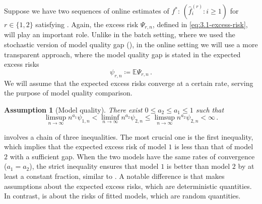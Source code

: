 \documentclass[11pt]{article}
\theoremstyle{plain}
\newtheorem{assumption}[theorem]{Assumption}
\begin{document}
Suppose we have two sequences of online estimates of $f^*$: $(\hat f_i^{(r)}:i\ge 1)$ for $r\in\{1,2\}$ satisfying .
  Again, the excess risk $\Psi_{r,n}$, defined in \eqref{eq:3.1-excess-risk}, will play an important role.   
Unlike in the batch setting, where we used the stochastic version of model quality gap (), in the online setting we will use a more transparent approach, where the model quality gap is stated in the expected excess risks
\begin{equation}\label{eq:3.3-expected-excess-risk}\psi_{r,n}\coloneqq\mathbb E \Psi_{r,n}\,.\end{equation}
We will assume that the expected excess risks converge at a certain rate, serving the purpose of model quality comparison.
\begin{assumption}[Model quality]\label{asm:3.3-rolling_model_quality} There exist $0\le a_2\le a_1\le 1$ such that
$$\limsup_{n\rightarrow\infty} n^{a_1}\psi_{1,n}<
\liminf_{n\rightarrow\infty} n^{a_2}\psi_{2,n}\le \limsup_{n\rightarrow\infty}n^{a_2}\psi_{2,n}<\infty\,.$$
\end{assumption}
 involves a chain of three inequalities. The most crucial one is the first inequality, which implies that the expected excess risk of model $1$ is less than that of model $2$ with a sufficient gap.  When the two models have the same rates of convergence ($a_1=a_2$), the strict inequality ensures that model $1$ is better than model $2$ by at least a constant fraction, similar to . A notable difference is that  makes assumptions about the expected excess risks, which are deterministic quantities. In contrast,  is about the risks of fitted models, which are random quantities.  
\end{document}
